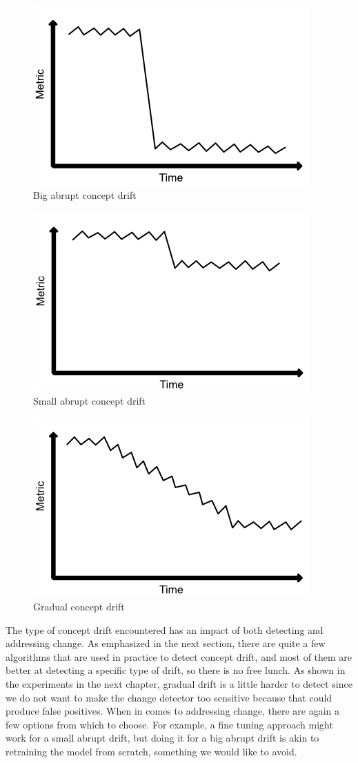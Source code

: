 \documentclass[12pt]{extreport}
\begin{document}
\begin{figure}[!ht]
\centering
\includegraphics[width=0.6\linewidth]{assets/preliminaries/big-abrupt-drift.png}
\caption{Big abrupt concept drift}
\label{fig:big-abrupt-drift}
\end{figure}

\begin{figure}[!ht]
\centering
\includegraphics[width=0.6\linewidth]{assets/preliminaries/small-abrupt-drift.png}
\caption{Small abrupt concept drift}
\label{fig:small-abrupt-drift}
\end{figure}

\begin{figure}[!ht]
\centering
\includegraphics[width=0.6\linewidth]{assets/preliminaries/gradual-drift.png}
\caption{Gradual concept drift}
\label{fig:gradual-drift}
\end{figure}

The type of concept drift encountered has an impact of both detecting and addressing change. As emphasized in the next section, there are quite a few algorithms that are used in practice to detect concept drift, and most of them are better at detecting a specific type of drift, so there is no free lunch. As shown in the experiments in the next chapter, gradual drift is a little harder to detect since we do not want to make the change detector too sensitive because that could produce false positives. When in comes to addressing change, there are again a few options from which to choose. For example, a fine tuning approach might work for a small abrupt drift, but doing it for a big abrupt drift is akin to retraining the model from scratch, something we would like to avoid.
\end{document}
